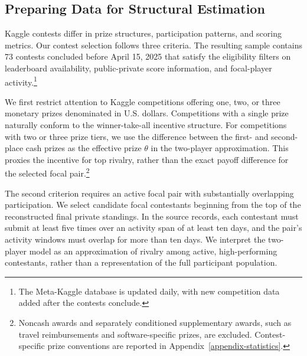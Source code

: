 \documentclass[mnsc]{informs3}
\begin{document}
\subsection{Preparing Data for Structural Estimation}
\label{sec-data-clean}

Kaggle contests differ in prize structures, participation patterns, and scoring metrics. Our contest selection follows three criteria.
The resulting sample contains 73 contests concluded before April 15, 2025 that satisfy the eligibility filters on leaderboard availability, public-private score information, and focal-player activity.\footnote{
The Meta-Kaggle database is updated daily, with new competition data added after the contests conclude.
}

We {first} restrict attention to Kaggle competitions offering one, two, or three monetary prizes denominated in U.S. dollars.
Competitions with a single prize naturally conform to the winner-take-all incentive structure.
For competitions with two or three prize tiers, we use the difference between the first- and second-place cash prizes as the effective prize $\theta$ in the two-player approximation. This proxies the incentive for top rivalry, rather than the exact payoff difference for the selected focal pair.\footnote{Noncash awards and separately conditioned supplementary awards, such as travel reimbursements and software-specific prizes, are excluded. Contest-specific prize conventions are reported in Appendix~\ref{appendix-statistics}.}

{The second criterion requires an active focal pair with substantially overlapping participation. We select candidate focal contestants beginning from the top of the reconstructed final private standings.}
In the source records, each contestant must submit at least five times over an activity span of at least ten days, and the pair's activity windows must overlap for more than ten days.
We interpret the two-player model as an approximation of rivalry among active, high-performing contestants, rather than a representation of the full participant population.
\end{document}
